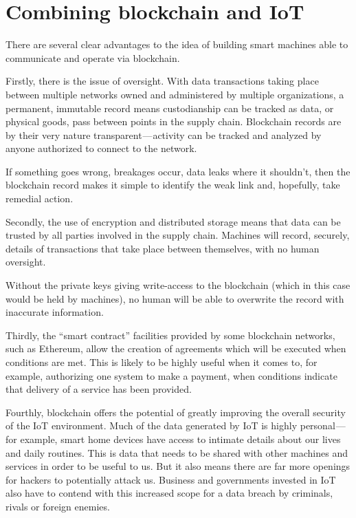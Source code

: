 \section{Combining blockchain and IoT}
There are several clear advantages to the idea of building smart machines able to communicate and operate via blockchain.

Firstly, there is the issue of oversight. With data transactions taking place between multiple networks owned and administered by multiple organizations, a permanent, immutable record means custodianship can be tracked as data, or physical goods, pass between points in the supply chain. Blockchain records are by their very nature transparent — activity can be tracked and analyzed by anyone authorized to connect to the network.

If something goes wrong, breakages occur, data leaks where it shouldn’t, then the blockchain record makes it simple to identify the weak link and, hopefully, take remedial action.

Secondly, the use of encryption and distributed storage means that data can be trusted by all parties involved in the supply chain. Machines will record, securely, details of transactions that take place between themselves, with no human oversight.

Without the private keys giving write-access to the blockchain (which in this case would be held by machines), no human will be able to overwrite the record with inaccurate information.

Thirdly, the “smart contract” facilities provided by some blockchain networks, such as Ethereum, allow the creation of agreements which will be executed when conditions are met. This is likely to be highly useful when it comes to, for example, authorizing one system to make a payment, when conditions indicate that delivery of a service has been provided.

Fourthly, blockchain offers the potential of greatly improving the overall security of the IoT environment. Much of the data generated by IoT is highly personal — for example, smart home devices have access to intimate details about our lives and daily routines. This is data that needs to be shared with other machines and services in order to be useful to us. But it also means there are far more openings for hackers to potentially attack us. Business and governments invested in IoT also have to contend with this increased scope for a data breach by criminals, rivals or foreign enemies.


